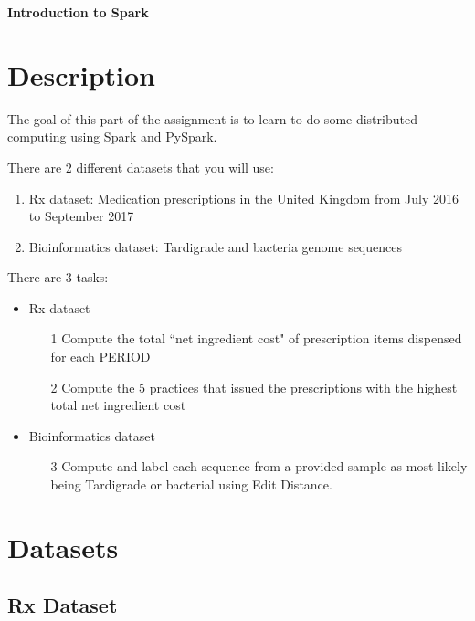 \documentclass[11pt]{article}
\renewcommand\:{\colon} %
\begin{document}

\begin{center}
{\bf \huge{Introduction to Spark}}
\end{center}


\vspace{10 pt}

\section{Description}

The goal of this part of the assignment is to learn to do some distributed computing using Spark and PySpark.  

There are 2 different datasets that you will use:
\begin{enumerate}
\item Rx dataset: Medication prescriptions in the United Kingdom from  July 2016 to September 2017
\item Bioinformatics dataset: Tardigrade and bacteria genome sequences
\end{enumerate}

There are 3 tasks:
\begin{itemize}
\item Rx dataset
\begin{enumerate}
\item[1]  Compute the total ``net ingredient cost" of prescription items dispensed for each PERIOD 
\item[2] Compute the 5 practices that issued the prescriptions with the highest total net ingredient cost
\end{enumerate}
\item Bioinformatics dataset
\begin{enumerate}
\item[3]  Compute and label each sequence from a provided sample as most likely being Tardigrade or bacterial using Edit Distance.
\end{enumerate}
\end{itemize}
\section{Datasets}
\subsection{Rx Dataset}
\end{document}
